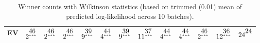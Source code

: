 \documentclass[11pt, a4paper, oneside,final,notitlepage,onecolumn]{article}\usepackage[]{graphicx}\usepackage[]{color}
\begin{document}
\begin{table}[!htb]
\begin{tabular}{rllllllllllll}
  EV & $2^{\stackrel{\textstyle46\hfill}{\scriptscriptstyle***\hfill}}$ & $2^{\stackrel{\textstyle46\hfill}{\scriptscriptstyle***\hfill}}$ & $2^{\stackrel{\textstyle46\hfill}{\scriptscriptstyle***\hfill}}$ & $9^{\stackrel{\textstyle39\hfill}{\scriptscriptstyle***\hfill}}$ & $4^{\stackrel{\textstyle44\hfill}{\scriptscriptstyle***\hfill}}$ & $9^{\stackrel{\textstyle39\hfill}{\scriptscriptstyle***\hfill}}$ & $11^{\stackrel{\textstyle37\hfill}{\scriptscriptstyle***\hfill}}$ & $4^{\stackrel{\textstyle44\hfill}{\scriptscriptstyle***\hfill}}$ & $4^{\stackrel{\textstyle44\hfill}{\scriptscriptstyle***\hfill}}$ & $2^{\stackrel{\textstyle46\hfill}{\scriptscriptstyle***\hfill}}$ & $12^{\stackrel{\textstyle36\hfill}{\scriptscriptstyle***\hfill}}$ & $24^{\stackrel{\textstyle24\hfill}{\scriptscriptstyle\hfill}}$ \\ 
   \hline
\end{tabular}
\caption{Winner counts with Wilkinson statistics (based on trimmed (0.01) mean of predicted log-likelihood across 10 batches).} 
\label{table_ACV2_cros_val_mean_.1}
\end{table}
\end{document}
